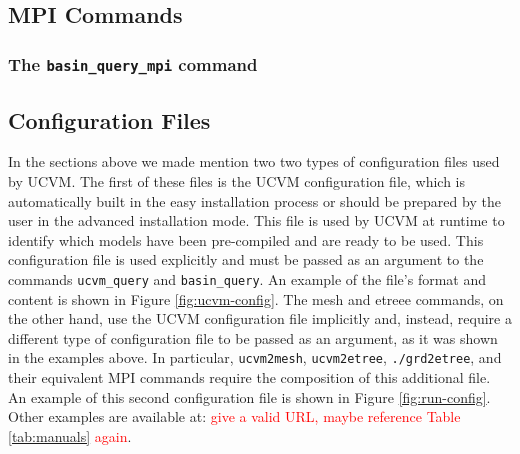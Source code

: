 \subsection{MPI Commands}


\subsubsection{The \textup{\texttt{basin\_query\_mpi}} command}



\subsection{Configuration Files}

In the sections above we made mention two two types of configuration files used by UCVM. The first of these files is the UCVM configuration file, which is automatically built in the easy installation process or should be prepared by the user in the advanced installation mode. This file is used by UCVM at runtime to identify which models have been pre-compiled and are ready to be used. This configuration file is used explicitly and must be passed as an argument to the commands \texttt{ucvm\_query} and \texttt{basin\_query}. An example of the file's format and content is shown in Figure \ref{fig:ucvm-config}. The mesh and etreee commands, on the other hand, use the UCVM configuration file implicitly and, instead, require a different type of configuration file to be passed as an argument, as it was shown in the examples above. In particular, \texttt{ucvm2mesh}, \texttt{ucvm2etree}, \texttt{./grd2etree}, and their equivalent MPI commands require the composition of this additional file. An example of this second configuration file is shown in Figure \ref{fig:run-config}. Other examples are available at: \textcolor{red}{give a valid URL, maybe reference Table \ref{tab:manuals} again}.


